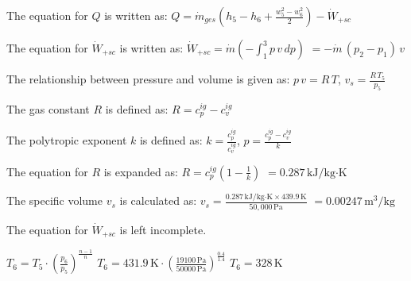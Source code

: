 The equation for \( Q \) is written as:  
\( Q = \dot{m}_{ges} \left( h_5 - h_6 + \frac{w_5^2 - w_6^2}{2} \right) - \dot{W}_{+sc} \)

The equation for \( \dot{W}_{+sc} \) is written as:  
\( \dot{W}_{+sc} = \dot{m} \left( - \int_{1}^{3} p \, v \, dp \right) \)  
\( = -\dot{m} \, (p_2 - p_1) \, v \)

The relationship between pressure and volume is given as:  
\( p \, v = R \, T \), \( v_s = \frac{R \, T_5}{p_5} \)

The gas constant \( R \) is defined as:  
\( R = c_p^{ig} - c_v^{ig} \)

The polytropic exponent \( k \) is defined as:  
\( k = \frac{c_p^{ig}}{c_v^{ig}} \), \( p = \frac{c_p^{ig} - c_v^{ig}}{k} \)

The equation for \( R \) is expanded as:  
\( R = c_p^{ig} \left( 1 - \frac{1}{k} \right) \)  
\( = 0.287 \, \text{kJ/kg·K} \)

The specific volume \( v_s \) is calculated as:  
\( v_s = \frac{0.287 \, \text{kJ/kg·K} \times 439.9 \, \text{K}}{50,000 \, \text{Pa}} \)  
\( = 0.00247 \, \text{m}^3/\text{kg} \)

The equation for \( \dot{W}_{+sc} \) is left incomplete.

\( T_6 = T_5 \cdot \left( \frac{p_6}{p_5} \right)^{\frac{n-1}{n}} \)  
\( T_6 = 431.9 \, \text{K} \cdot \left( \frac{19100 \, \text{Pa}}{50000 \, \text{Pa}} \right)^{\frac{0.4}{1.4}} \)  
\( T_6 = 328 \, \text{K} \)